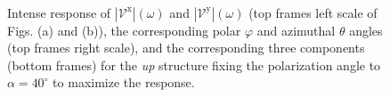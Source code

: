 \documentclass[prb,11pt,tightenlines,twocolumn,aps]{revtex4-1}
\begin{document}
\begin{figure}[t]
    \centering
    \\
    
    \caption{Intense response of
    $|\mathcal{V}^{\mathrm{x}}|(\omega)$ and
    $|\mathcal{V}^{\mathrm{y}}|(\omega)$ (top frames left scale of Figs. (a) and
    (b)), the corresponding polar $\varphi$ and azimuthal $\theta$ angles (top
    frames right scale), and the corresponding three components (bottom frames)
    for the \emph{up} structure fixing the polarization angle to
    $\alpha=40^{\circ}$ to maximize the response.}

    \label{fig:up-vab-comp-rtp-2}
\end{figure}
\end{document}
